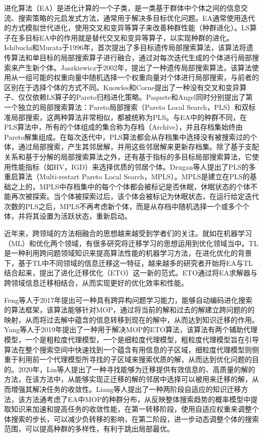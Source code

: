 \par
进化算法（EA）是进化计算的一个子类，是一类基于群体中个体之间的信息交流、搜索策略的元启发式方法，通常用于解决多目标优化问题。EA通常使用迭代的方式模拟世代进化，使用交叉和变异等算子来改善种群性能（种群进化）。LS算子在多目标EA中的作用就是替代交叉和变异等算子，以实现种群的进化。Ishibuchi和Murata于1996年，首次提出了多目标遗传局部搜索算法\cite{ishibuchi1996multi}，该算法将遗传算法和单目标的局部搜索算子进行融合，通过对每次迭代生成的个体进行局部搜索来产生新个体。Jaszkiewicz于2002年，提出了一种遗传局部搜索算法\cite{jaszkiewicz2002genetic}，该算法使用从一组可能的权重向量中随机选择一个权重向量对个体进行局部搜索，与前者的区别在于选择个体的方式不同。Knowles和Corne提出了一种没有交叉和变异算子、仅仅依赖LS算子的Pareto归档进化策略\cite{knowles1999pareto,knowles2000approximating}。Paquete\cite{paquete2004pareto}和Angel\cite{angel2004approximating}同时分别提出了第一个独立的局部搜索算法：Pareto局部搜索（Pareto Local Search，PLS）和双标准局部搜索，这两种算法非常相似，都被统称为PLS。与EA中的种群不同，在PLS算法中，所有的个体组成的集合称为存档（Archive），并且存档集始终由Pareto解集组成。在每次迭代中，PLS算法都会从存档集中选择没有被搜索过的个体，通过局部搜索，产生其邻居解，并用这些邻居解来更新存档集。除了基于支配关系和基于分解的局部搜索算法之外，还有基于指标的多目标局部搜索算法\cite{basseur2007indicator}，它使用性能指标（如HV，IGD）来选择优质的邻居个体。Drugan等人提出了PLS的多重启算法（Multi-restart Pareto Local Search，MPLS）\cite{drugan2012stochastic}。MPLS是建立在PLS的基础之上的，MPLS中存档集中的每个个体都会被标记是否休眠，休眠状态的个体不能再次被探索。当个体被探索过后，该个体会被标记为休眠状态，在运行给定迭代次数的PLS之后，MPLS不再考虑新个体，而是从存档中随机选择一个或多个个体，并将其设置为活跃状态，重新启动。
\par
近年来，跨领域的方法相融合的思想越来越受到学者们的关注。就如在机器学习（ML）和优化两个领域，有很多研究将迁移学习的思想运用到优化领域当中。TL是一种利用跨问题领域知识来提高算法性能的机器学习方法，在进化优化的背景下，基于TL中不同领域的信息迁移这一特征，越来越多的研究者开始将EA与TL结合起来，提出了进化迁移优化（ETO）这一新的范式。ETO通过将EA求解器与跨领域信息迁移相结合，从而实现更好的优化效率和性能。
\par
Feng等人于2017年提出可一种具有跨异构问题学习能力，能够自动编码进化搜索的算法框架\cite{feng2017autoencoding}，该算法能够针对MOP，通过将当前的解和过去的解建立跨问题的的映射，从而将过去解中蕴含的信息转移到现在的解中，从而达到知识迁移的作用。Yang等人于2019年提出了一种用于解决MOP的ETO算法\cite{yang2019offline}，该算法有两个辅助代理模型，一个是粗粒度代理模型，一个是细粒度代理模型，粗粒度代理模型旨在引导算法在整个搜索空间中快速找到一个蕴含有用信息的子区域，细粒度代理模型则侧重于利用前一个代理模型所寻找的子区域来搜索优质的解，从而达到优化问题的目的。2020年，Lin等人提出了一种寻找能够为迁移提供有效信息的、高质量的解的方法\cite{lin2020effective}，在该方法中，从能够实现正迁移的解的邻居中选择可以被用来迁移的解，从而增强其解决任务的收敛性。Liang等人提出了一种两阶段自适应的知识迁移方法\cite{liang2020two}，该方法通考虑了EA中MOP的种群分布，从反映整体搜索趋势的概率模型中提取知识来加速和提高任务的收敛性能，在第一转移阶段，使用自适应权重来调整个体搜索的步长，可以减少负转移的影响，在第二阶段，进一步动态调整个体的搜索范围，可以提高种群的多样性，有利于跳出局部最优。
